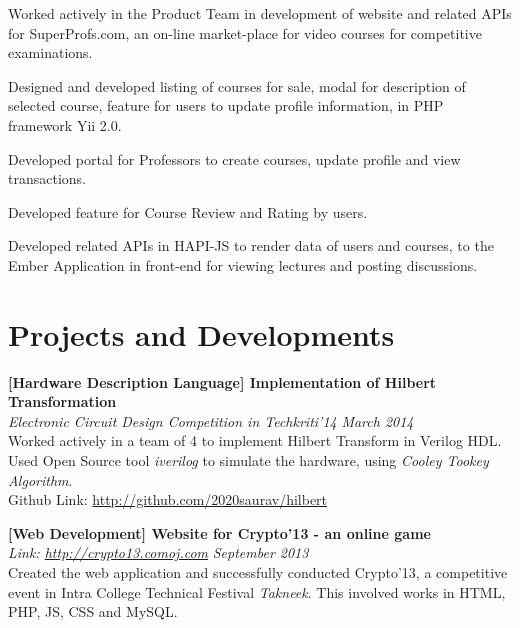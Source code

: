 \documentclass[margin,10pt]{resume}
\begin{document}
\begin{resume}
\begin{list2}
	\begin{list3}
	\vspace{2mm}
	\item Worked actively in the Product Team in development of website and related APIs for SuperProfs.com, an on-line market-place for video courses for competitive examinations.\vspace{2mm}
	\item Designed and developed listing of courses for sale, modal for description of selected course, feature for users to update profile information, in PHP framework Yii 2.0.
	\vspace{2mm}
	\item Developed portal for Professors to create courses, update profile and view transactions.\vspace{2mm}
	\item Developed feature for Course Review and Rating by users.
	\vspace{2mm}
	\item Developed related APIs in HAPI-JS to render data of users and courses, to the Ember Application in front-end for viewing lectures and posting discussions. 
	\end{list3}

\end{list2}
\newpage
\vspace*{0.4cm}
\section{\mysidestyle Projects and Developments }
\begin{list2}
\item \textbf{[Hardware Description Language] Implementation of Hilbert Transformation}\\
	\textsl{Electronic Circuit Design Competition in Techkriti'14} \hfill \emph{March 2014}\\
	Worked actively in a team of 4 to implement Hilbert Transform in Verilog HDL. Used Open Source tool \emph{iverilog} to simulate the hardware, using \emph{Cooley Tookey Algorithm}.\\
	Github Link: \url{http://github.com/2020saurav/hilbert}\\ 

\item \textbf{[Web Development] Website for Crypto'13 - an online game} \\
    \textsl{Link: \url{http://crypto13.comoj.com}} \hfill \emph{September 2013}\\
Created the web application and successfully conducted Crypto'13, a competitive event in Intra College Technical Festival \emph{Takneek}. This involved works in HTML, PHP, JS, CSS and MySQL.\\


\end{list2}
\end{resume}
\end{document}
